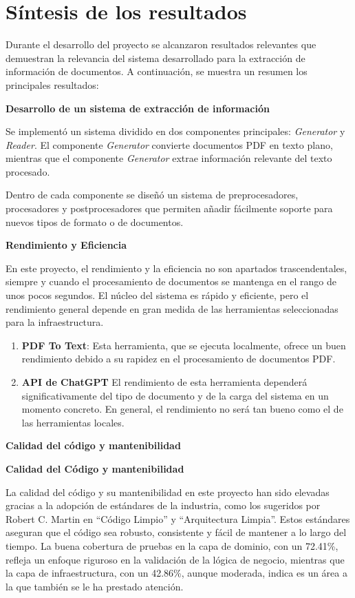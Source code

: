 \section{Síntesis de los resultados}

Durante el desarrollo del proyecto se alcanzaron resultados relevantes que demuestran la relevancia del sistema
desarrollado para la extracción de información de documentos.
A continuación, se muestra un resumen los principales resultados:

\textbf{Desarrollo de un sistema de extracción de información}

Se implementó un sistema dividido en dos componentes principales: \textit{Generator} y \textit{Reader}.
El componente \textit{Generator} convierte documentos PDF en texto plano, mientras que el componente \textit{Generator}
extrae información relevante del texto procesado.

Dentro de cada componente se diseñó un sistema de preprocesadores, procesadores y postprocesadores que permiten
añadir fácilmente soporte para nuevos tipos de formato o de documentos.

\textbf{Rendimiento y Eficiencia}

En este proyecto, el rendimiento y la eficiencia no son apartados trascendentales, siempre y cuando el procesamiento de
documentos se mantenga en el rango de unos pocos segundos.
El núcleo del sistema es rápido y eficiente, pero el rendimiento general depende en gran medida de las herramientas
seleccionadas para la infraestructura.

\begin{enumerate}
    \item \textbf{PDF To Text}: Esta herramienta, que se ejecuta localmente, ofrece un buen rendimiento debido a su
    rapidez en el procesamiento de documentos PDF.
    \item \textbf{API de ChatGPT}
    El rendimiento de esta herramienta dependerá significativamente del tipo de documento y de la
    carga del sistema en un momento concreto.
    En general, el rendimiento no será tan bueno como el de las herramientas locales.
\end{enumerate}


\textbf {Calidad del código y mantenibilidad}

\textbf{Calidad del Código y mantenibilidad}

La calidad del código y su mantenibilidad en este proyecto han sido elevadas gracias a la adopción de estándares de la
industria, como los sugeridos por Robert C. Martin en ``Código Limpio'' y ``Arquitectura Limpia''.
Estos estándares aseguran que el código sea robusto, consistente y fácil de mantener a lo largo del tiempo.
La buena cobertura de pruebas en la capa de dominio, con un 72.41\%, refleja un enfoque riguroso en la validación de la
lógica de negocio, mientras que la capa de infraestructura, con un 42.86\%, aunque moderada, indica es un área a la
que también se le ha prestado atención.

